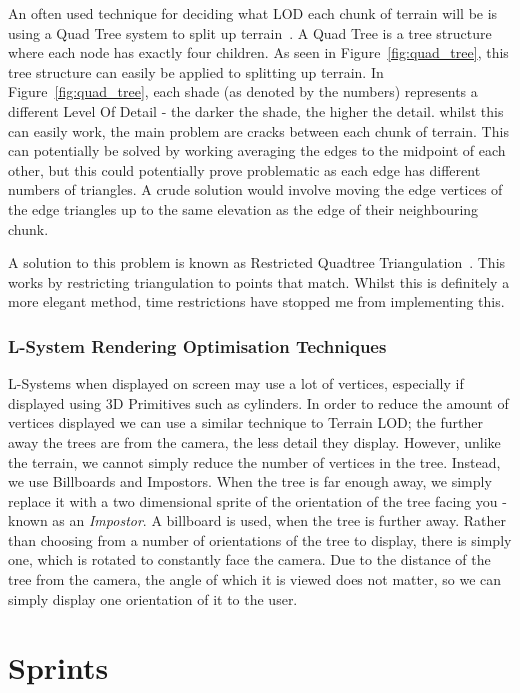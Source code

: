 \documentclass[a4paper,10pt]{report}
\begin{document}
An often used technique for deciding what LOD each chunk of terrain will be is using a Quad Tree system to split up terrain~\cite{pajarola1998large}. A Quad Tree is a tree structure where each node has exactly four children. As seen in Figure~\ref{fig:quad_tree}, this tree structure can easily be applied to splitting up terrain. In Figure~\ref{fig:quad_tree}, each shade (as denoted by the numbers) represents a different Level Of Detail - the darker the shade, the higher the detail. whilst this can easily work, the main problem are cracks between each chunk of terrain. This can potentially be solved by working averaging the edges to the midpoint of each other, but this could potentially prove problematic as each edge has different numbers of triangles. A crude solution would involve moving the edge vertices of the edge triangles up to the same elevation as the edge of their neighbouring chunk. \medskip

A solution to this problem is known as Restricted Quadtree Triangulation~\cite{pajarola1998large}. This works by restricting triangulation to points that match. Whilst this is definitely a more elegant method, time restrictions have stopped me from implementing this. 

\subsection{L-System Rendering Optimisation Techniques}
L-Systems when displayed on screen may use a lot of vertices, especially if displayed using 3D Primitives such as cylinders. In order to reduce the amount of vertices displayed we can use a similar technique to Terrain LOD; the further away the trees are from the camera, the less detail they display. However, unlike the terrain, we cannot simply reduce the number of vertices in the tree. Instead, we use Billboards and Impostors. When the tree is far enough away, we simply replace it with a two dimensional sprite of the orientation of the tree facing you - known as an \textit{Impostor}. A billboard is used, when the tree is further away. Rather than choosing from a number of orientations of the tree to display, there is simply one, which is rotated to constantly face the camera. Due to the distance of the tree from the camera, the angle of which it is viewed does not matter, so we can simply display one orientation of it to the user.


\chapter{Sprints}
\end{document}

